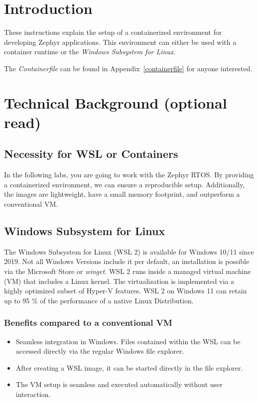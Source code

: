 



\puttitle{}

\section{Introduction}

These instructions explain the setup of a containerized environment for
developing Zephyr applications. This environment can either be used with a
container runtime or the \emph{Windows Subsystem for Linux}.

The \emph{Containerfile} can be found in Appendix~\ref{containerfile} for anyone
interested.

\section{Technical Background (optional read)}

\subsection{Necessity for WSL or Containers}

In the following labs, you are going to work with the Zephyr RTOS. By providing
a containerized environment, we can ensure a reproducible setup. Additionally,
the images are lightweight, have a small memory footprint, and outperform a
conventional VM.

\subsection{Windows Subsystem for Linux}

The Windows Subsystem for Linux (WSL 2) is available for Windows 10/11 since
2019. Not all Windows Versions include it per default, an installation is
possible via the Microsoft Store or \emph{winget}. WSL 2 runs inside a managed
virtual machine (VM) that includes a Linux kernel. The virtualization is
implemented via a highly optimized subset of Hyper-V features. WSL 2 on Windows
11 can retain up to 95 \% of the performance of a native Linux Distribution.

\subsubsection*{Benefits compared to a conventional VM}

\begin{itemize}
\item Seamless integration in Windows. Files contained within the WSL can be
  accessed directly via the regular Windows file explorer.
\item After creating a WSL image, it can be started directly in the file explorer.
\item The VM setup is seamless and executed automatically without user
  interaction.
\end{itemize}

